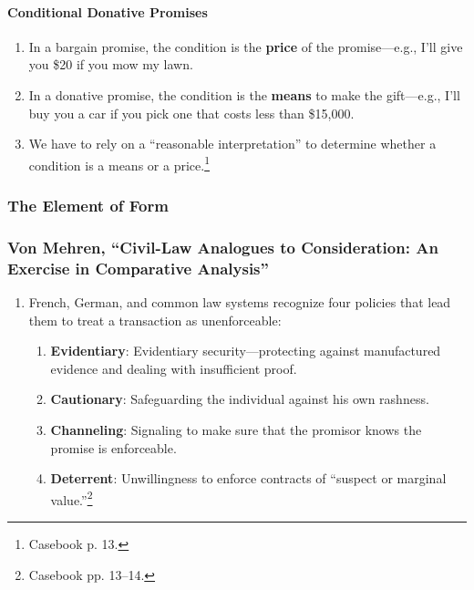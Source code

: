 \paragraph{Conditional Donative Promises}

\begin{enumerate}
    \item In a bargain promise, the condition is the \textbf{price} of the 
    promise---e.g., I'll give you \$20 if you mow my lawn.
    \item In a donative promise, the condition is the \textbf{means} to make 
    the gift---e.g., I'll buy you a car if you pick one that costs less than 
    \$15,000. 
    \item We have to rely on a ``reasonable interpretation'' to determine 
    whether a condition is a means or a price.\footnote{Casebook p. 13.}
\end{enumerate}

\subsubsection{The Element of Form}

\subsubsection{Von Mehren, ``Civil-Law Analogues to Consideration: An Exercise 
in Comparative Analysis''}

\begin{enumerate}
    \item French, German, and common law systems recognize four policies that 
    lead them to treat a transaction as unenforceable:
    \begin{enumerate}
        \item \textbf{Evidentiary}: Evidentiary security---protecting against 
        manufactured evidence and dealing with insufficient proof.
        \item \textbf{Cautionary}: Safeguarding the individual against his own 
        rashness.
        \item \textbf{Channeling}: Signaling to make sure that the promisor 
        knows the promise is enforceable.
        \item \textbf{Deterrent}: Unwillingness to enforce contracts of 
        ``suspect or marginal value.''\footnote{Casebook pp. 13--14.}
    \end{enumerate}
\end{enumerate}

